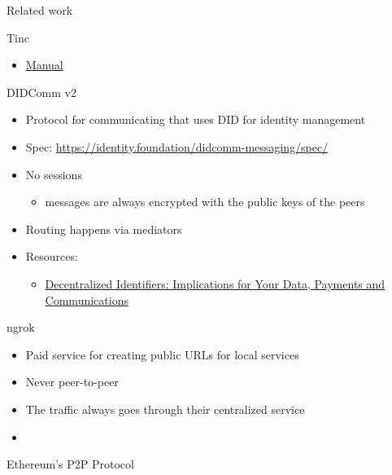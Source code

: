 \begin{frame}[fragile]{Related work}
\begin{block}{Tinc}
\begin{itemize}
  \begin{itemize}
  \tightlist
  \item
    \href{https://www.tinc-vpn.org/documentation-1.1/tinc.pdf}{Manual}
  \end{itemize}
\end{itemize}
\end{block}

\begin{block}{DIDComm v2}
\protect\hypertarget{didcomm-v2}{}
\begin{itemize}
\tightlist
\item
  Protocol for communicating that uses DID for identity management
\item
  Spec: \url{https://identity.foundation/didcomm-messaging/spec/}
\item
  No sessions

  \begin{itemize}
  \tightlist
  \item
    messages are always encrypted with the public keys of the peers
  \end{itemize}
\item
  Routing happens via mediators
\item
  Resources:

  \begin{itemize}
  \tightlist
  \item
    \href{https://newsletter.impervious.ai/decentralized-identifiers-implications-for-your-data-payments-and-communications-2/}{Decentralized
    Identifiers: Implications for Your Data, Payments and
    Communications}
  \end{itemize}
\end{itemize}
\end{block}

\begin{block}{ngrok}
\protect\hypertarget{ngrok}{}
\begin{itemize}
\tightlist
\item
  Paid service for creating public URLs for local services
\item
  Never peer-to-peer
\item
  The traffic always goes through their centralized service
\item
\end{itemize}
\end{block}

\begin{block}{Ethereum's P2P Protocol}
\protect\hypertarget{ethereums-p2p-protocol}{}
\end{block}


\end{frame}
